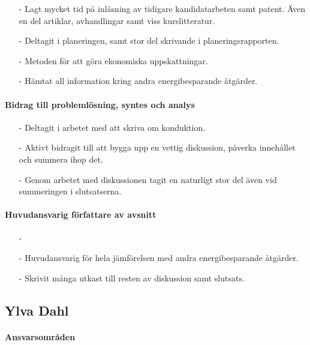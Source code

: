 \documentclass[12pt,a4paper]{article}
\begin{document}
\begin{itemize}
\item[-] Lagt mycket tid på inläsning av tidigare kandidatarbeten samt patent. Även en del artiklar, avhandlingar samt viss kurslitteratur. 
\item[-] Deltagit i planeringen, samt stor del skrivande i planeringsrapporten.
\item[-] Metoden för att göra ekonomiska uppskattningar.
\item[-] Hämtat all information kring andra energibesparande åtgärder. 
\end{itemize}


\paragraph{Bidrag till problemlösning, syntes och analys}

\begin{itemize}
\item[-] Deltagit i arbetet med att skriva om konduktion.
\item[-] Aktivt bidragit till att bygga upp en vettig diskussion, påverka innehållet och summera ihop det.
\item[-] Genom arbetet med diskussionen tagit en naturligt stor del även vid summeringen i slutsatserna.
\end{itemize}


\paragraph{Huvudansvarig författare av avsnitt}

\begin{itemize}
\item[-] 
\item[-] Huvudansvarig för hela jämförelsen med andra energibesparande åtgärder.
\item[-] Skrivit många utkast till resten av diskussion samt slutsats.
\end{itemize}




\subsection*{Ylva Dahl}

\paragraph{Ansvarsområden}
\end{document}
